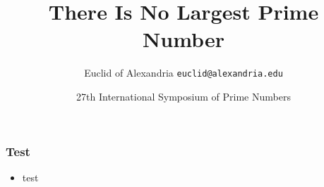 \documentclass{beamer}
\title{There Is No Largest Prime Number}
\date[ISPN ’80]{27th International Symposium of Prime Numbers}
\author[Euclid]{Euclid of Alexandria \texttt{euclid@alexandria.edu}}
\begin{document}
\begin{frame}
\titlepage
\end{frame}

\begin{frame}
    \frametitle{Test}
    \begin{itemize}
        \item{test}
    \end{itemize}
\end{frame}
\end{document}
